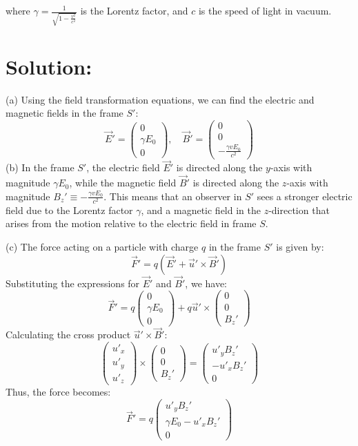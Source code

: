 where $\gamma = \frac{1}{\sqrt{1 - \frac{v^2}{c^2}}}$ is the Lorentz factor, and $c$ is the speed of light in vacuum.

\section*{Solution:}

\begin{solution}
(a) Using the field transformation equations, we can find the electric and magnetic fields in the frame $S'$:
\[
\boxed{
\vec{E}' = \begin{pmatrix}
0 \\ \gamma E_0 \\ 0
\end{pmatrix}, \quad
\vec{B}' = \begin{pmatrix}
0 \\ 0 \\ -\frac{\gamma v E_0}{c^2}
\end{pmatrix}
}
\]
\noindent
(b) In the frame $S'$, the electric field $\vec{E}'$ is directed along the $y$-axis with magnitude $\gamma E_0$, while the magnetic field $\vec{B}'$ is directed along the $z$-axis with magnitude $B_z' \equiv -\frac{\gamma v E_0}{c^2}$. This means that an observer in $S'$ sees a stronger electric field due to the Lorentz factor $\gamma$, and a magnetic field in the $z$-direction that arises from the motion relative to the electric field in frame $S$.

\noindent
(c) The force acting on a particle with charge $q$ in the frame $S'$ is given by:
\[\vec{F}' = q\left(\vec{E}' + \vec{u}' \times \vec{B}'\right)\]
Substituting the expressions for $\vec{E}'$ and $\vec{B}'$, we have:
\[
\vec{F}' = q\begin{pmatrix}
0 \\ \gamma E_0 \\ 0
\end{pmatrix} + q\vec{u}' \times \begin{pmatrix}
0 \\ 0 \\ B_z'
\end{pmatrix}
\]
Calculating the cross product $\vec{u}' \times \vec{B}'$:
\[\begin{pmatrix}
u'_x \\ u'_y \\ u'_z
\end{pmatrix} \times \begin{pmatrix}
0 \\ 0 \\ B_z'
\end{pmatrix} = \begin{pmatrix}
u'_y B_z' \\  -u'_x B_z' \\ 0
\end{pmatrix}
\]
Thus, the force becomes:
\[
\boxed{
\vec{F}' = q\begin{pmatrix}
u'_y B_z' \\ \gamma E_0 - u'_x B_z' \\ 0
\end{pmatrix}
}
\]
\end{solution}


